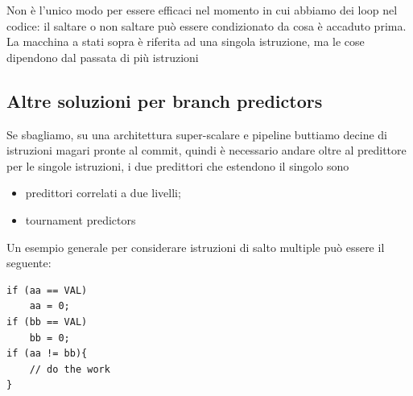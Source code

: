 \documentclass[12pt, oneside]{extbook}
\begin{document}
Non è l'unico modo per essere efficaci nel momento in cui abbiamo dei loop nel codice: il saltare o non saltare può essere condizionato da cosa è accaduto prima. La macchina a stati sopra è riferita ad una singola istruzione, ma le cose dipendono dal passata di più istruzioni
\subsection{Altre soluzioni per branch predictors}
Se sbagliamo, su una architettura super-scalare e pipeline buttiamo decine di istruzioni magari pronte al commit, quindi è necessario andare oltre al predittore per le singole istruzioni, i due predittori che estendono il singolo sono
\begin{itemize}
\item predittori correlati a due livelli;
\item tournament predictors
\end{itemize}
Un esempio generale per considerare istruzioni di salto multiple può essere il seguente:
\begin{lstlisting}
if (aa == VAL)
	aa = 0;
if (bb == VAL)
	bb = 0;
if (aa != bb){
	// do the work
}
\end{lstlisting}
\end{document}
